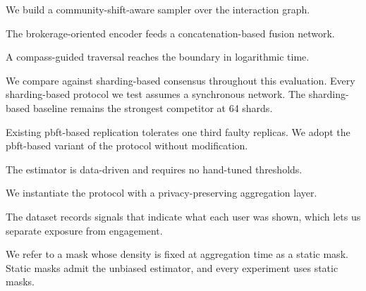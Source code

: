 %

We build a community-shift-aware sampler over the interaction graph.

The brokerage-oriented encoder feeds a concatenation-based fusion network.

A compass-guided traversal reaches the boundary in logarithmic time.

We compare against sharding-based consensus throughout this evaluation.
Every sharding-based protocol we test assumes a synchronous network.
The sharding-based baseline remains the strongest competitor at 64 shards.

Existing pbft-based replication tolerates one third faulty replicas.
We adopt the pbft-based variant of the protocol without modification.

The estimator is data-driven and requires no hand-tuned thresholds.

We instantiate the protocol with a privacy-preserving aggregation layer.

The dataset records signals that indicate what each user was shown, which lets us separate exposure from engagement.

We refer to a mask whose density is fixed at aggregation time as a static mask.
Static masks admit the unbiased estimator, and every experiment uses static masks.

